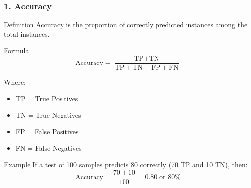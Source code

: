 \documentclass[aspectratio=169]{beamer}
\begin{document}
\begin{frame}[fragile]
    \frametitle{1. Accuracy}
    \begin{block}{Definition}
        Accuracy is the proportion of correctly predicted instances among the total instances.
    \end{block}
    \begin{block}{Formula}
        \begin{equation}
        \text{Accuracy} = \frac{\text{TP} + \text{TN}}{\text{TP} + \text{TN} + \text{FP} + \text{FN}}
        \end{equation}
    \end{block}
    Where:
    \begin{itemize}
        \item TP = True Positives
        \item TN = True Negatives
        \item FP = False Positives
        \item FN = False Negatives
    \end{itemize}
    \begin{block}{Example}
        If a test of 100 samples predicts 80 correctly (70 TP and 10 TN), then:
        \[
        \text{Accuracy} = \frac{70 + 10}{100} = 0.80 \text{ or } 80\%
        \]
    \end{block}
\end{frame}
\end{document}
